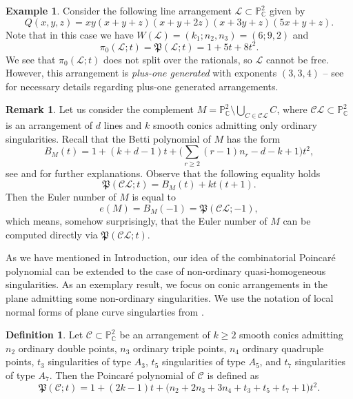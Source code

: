 \documentclass[12pt]{article}
\theoremstyle{plain}
\theoremstyle{definition}
\newtheorem{definition}[thm]{Definition}
\newtheorem{remark}[thm]{Remark}
\newtheorem{example}[thm]{Example}
\begin{document}
\begin{example}
Consider the following line arrangement $\mathcal{L} \subset \mathbb{P}^{2}_{\mathbb{C}}$ given by
$$Q(x,y,z) = xy(x+y+z)(x+y+2z)(x+3y+z)(5x+y+z).$$
Note that in this case we have $W(\mathcal{L}) = (k_{1}; n_{2},n_{3}) = (6;9,2)$ and 
$$\pi_{0}(\mathcal{L};t) = \mathfrak{P}(\mathcal{L};t) = 1+5t + 8t^{2}.$$
We see that $\pi_{0}(\mathcal{L};t)$ does not split over the rationals, so $\mathcal{L}$ cannot be free. However, this arrangement is \textit{plus-one generated} with exponents $(3,3,4)$ -- see \cite{ABE} for necessary details regarding plus-one generated arrangements.
\end{example}
\begin{remark}
\label{euler}
Let us consider the complement $M=\mathbb{P}^{2}_{\mathbb{C}} \setminus \bigcup_{C \in \mathcal{CL}}C$, where $\mathcal{CL}\subset \mathbb{P}^{2}_{\mathbb{C}}$ is an arrangement of $d$ lines and $k$ smooth conics admitting only ordinary singularities. Recall that the Betti polynomial of $M$ has the form
$$B_{M}(t) = 1 + (k+d-1)t+ \bigg(\sum_{r\geq 2}(r-1)n_{r}-d-k+1 \bigg)t^{2},$$
see \cite[Section 2.1]{Cog} and \cite[Section 1.2]{ST} for further explanations.
Observe that the following equality holds
\begin{equation}
    \mathfrak{P}(\mathcal{CL};t) = B_{M}(t) + kt(t+1).
\end{equation}
Then the Euler number of $M$ is equal to
$$e(M) = B_{M}(-1) = \mathfrak{P}(\mathcal{CL};-1),$$
which means, somehow surprisingly, that the Euler number of $M$ can be computed directly via $\mathfrak{P}(\mathcal{CL};t)$.
\end{remark}
As we have mentioned in Introduction, our idea of the combinatorial Poincar\'e polynomial can be extended to the case of non-ordinary quasi-homogeneous singularities. As an exemplary result, we focus on conic arrangements in the plane admitting some non-ordinary singularities. We use the notation of local normal forms of plane curve singularties from \cite{arnold}.
\begin{definition}
Let $\mathcal{C} \subset \mathbb{P}^{2}_{\mathbb{C}}$ be an arrangement of $k\geq 2$ smooth conics admitting $n_{2}$ ordinary double points, $n_{3}$ ordinary triple points, $n_{4}$ ordinary quadruple points, $t_{3}$ singularities of type $A_{3}$, $t_{5}$ singularities of type $A_{5}$, and $t_{7}$ singularities of type $A_{7}$. Then the Poincar\'e polynomial of $\mathcal{C}$ is defined as
$$\mathfrak{P}(\mathcal{C};t) = 1 + (2k-1)t + \bigg(n_{2} + 2n_{3} + 3n_{4} +t_{3} + t_{5} + t_{7} + 1\bigg)t^{2}.$$
\end{definition}
\end{document}
